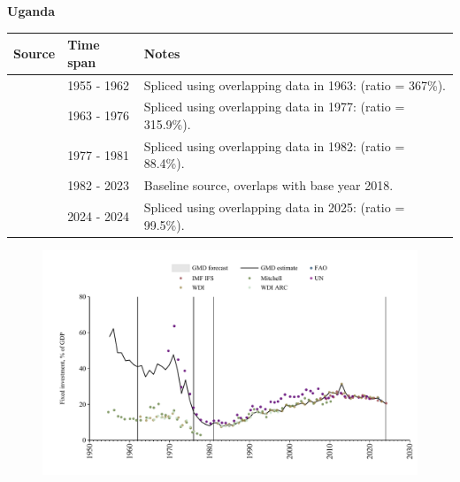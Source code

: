 \documentclass[12pt,a4paper,landscape]{article}
\begin{document}
\begin{adjustbox}{max totalsize={\paperwidth}{\paperheight},center}
\begin{minipage}[t][\textheight][t]{\textwidth}
\vspace*{0.5cm}
{}
\begin{center}
{\Large\bfseries Uganda}
\end{center}
\vspace{0.5cm}
\begin{table}[H]
\centering
\small
\begin{tabular}{|l|l|l|}
\hline
\textbf{Source} & \textbf{Time span} & \textbf{Notes} \\
\hline
\rowcolor{white}\cite{Mitchell}& 1955 - 1962 &Spliced using overlapping data in 1963: (ratio = 367\%).\\
\rowcolor{lightgray}\cite{WDI}& 1963 - 1976 &Spliced using overlapping data in 1977: (ratio = 315.9\%).\\
\rowcolor{white}\cite{UN}& 1977 - 1981 &Spliced using overlapping data in 1982: (ratio = 88.4\%).\\
\rowcolor{lightgray}\cite{WDI}& 1982 - 2023 &Baseline source, overlaps with base year 2018.\\
\rowcolor{white}\cite{IMF_IFS}& 2024 - 2024 &Spliced using overlapping data in 2025: (ratio = 99.5\%).\\
\hline
\end{tabular}
\end{table}
\begin{figure}[H]
\centering
\includegraphics[width=\textwidth,height=0.6\textheight,keepaspectratio]{graphs/UGA_finv_GDP.pdf}
\end{figure}
\end{minipage}
\end{adjustbox}
\end{document}
